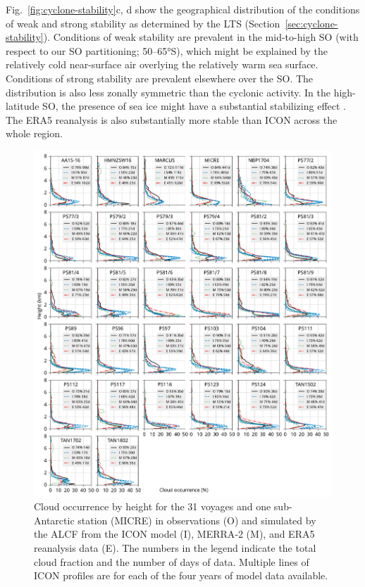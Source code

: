 \documentclass[draft]{agujournal2019}
\begin{document}
Fig.~\ref{fig:cyclone-stability}c, d show the geographical distribution of the conditions of weak and strong stability as determined by the LTS (Section~\ref{sec:cyclone-stability}). Conditions of weak stability are prevalent in the mid-to-high SO (with respect to our SO partitioning; 50--65°S), which might be explained by the relatively cold near-surface air overlying the relatively warm sea surface. Conditions of strong stability are prevalent elsewhere over the SO. The distribution is also less zonally symmetric than the cyclonic activity. In the high-latitude SO, the presence of sea ice might have a substantial stabilizing effect \cite{knight2024}. The ERA5 reanalysis is also substantially more stable than ICON across the whole region.

\begin{figure}[p!]
\centerline{
\includegraphics[width=1.06\textwidth]{img/cloud_occurrence_panel.pdf}
}
\caption{
Cloud occurrence by height for the 31 voyages and one sub-Antarctic station (MICRE) in observations (O) and simulated by the ALCF from the ICON model (I), MERRA‐2 (M), and ERA5 reanalysis data (E). The numbers in the legend indicate the total cloud fraction and the number of days of data. Multiple lines of ICON profiles are for each of the four years of model data available.
}
\label{fig:cloud-occurrence-panel}
\end{figure}
\end{document}
